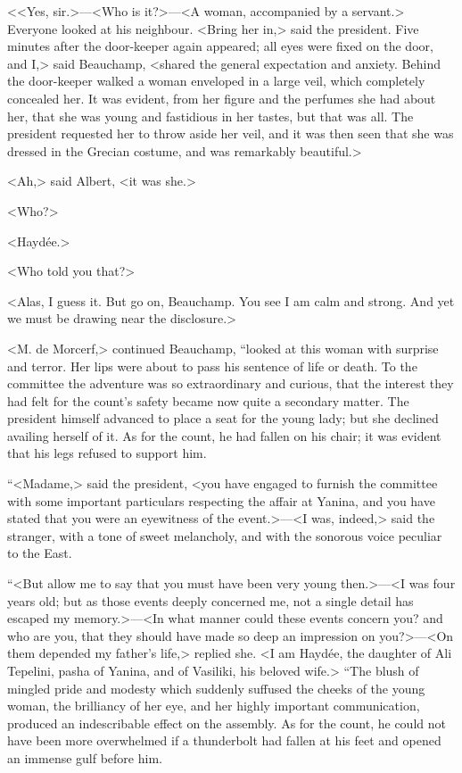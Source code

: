  <<Yes, sir.>—<Who is it?>—<A woman, accompanied by a servant.> Everyone looked at his neighbour. <Bring her in,> said the president. Five minutes after the door-keeper again appeared; all eyes were fixed on the door, and I,> said Beauchamp, <shared the general expectation and anxiety. Behind the door-keeper walked a woman enveloped in a large veil, which completely concealed her. It was evident, from her figure and the perfumes she had about her, that she was young and fastidious in her tastes, but that was all. The president requested her to throw aside her veil, and it was then seen that she was dressed in the Grecian costume, and was remarkably beautiful.> 

 <Ah,> said Albert, <it was she.> 

 <Who?> 

 <Haydée.> 

 <Who told you that?> 

 <Alas, I guess it. But go on, Beauchamp. You see I am calm and strong. And yet we must be drawing near the disclosure.> 

 <M. de Morcerf,> continued Beauchamp, “looked at this woman with surprise and terror. Her lips were about to pass his sentence of life or death. To the committee the adventure was so extraordinary and curious, that the interest they had felt for the count's safety became now quite a secondary matter. The president himself advanced to place a seat for the young lady; but she declined availing herself of it. As for the count, he had fallen on his chair; it was evident that his legs refused to support him. 

 “<Madame,> said the president, <you have engaged to furnish the committee with some important particulars respecting the affair at Yanina, and you have stated that you were an eyewitness of the event.>—<I was, indeed,> said the stranger, with a tone of sweet melancholy, and with the sonorous voice peculiar to the East. 

 “<But allow me to say that you must have been very young then.>—<I was four years old; but as those events deeply concerned me, not a single detail has escaped my memory.>—<In what manner could these events concern you? and who are you, that they should have made so deep an impression on you?>—<On them depended my father's life,> replied she. <I am Haydée, the daughter of Ali Tepelini, pasha of Yanina, and of Vasiliki, his beloved wife.>  “The blush of mingled pride and modesty which suddenly suffused the cheeks of the young woman, the brilliancy of her eye, and her highly important communication, produced an indescribable effect on the assembly. As for the count, he could not have been more overwhelmed if a thunderbolt had fallen at his feet and opened an immense gulf before him. 

